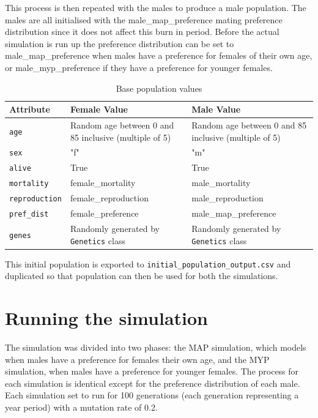 \documentclass[authoryearcitations]{UoYCSproject}
\begin{document}
This process is then repeated with the males to produce a male population. The males are all initialised with the male\_map\_preference mating preference distribution since it does not affect this burn in period. Before the actual simulation is run up the preference distribution can be set to male\_map\_preference when males have a preference for females of their own age, or male\_myp\_preference if they have a preference for younger females. 


\begin{table}[h]
\caption{Base population values}
\label{tbl:basePopulationValues}
\begin{tabular}{m{} m{} m{}}
\textbf{Attribute} & \textbf{Female Value} & \textbf{Male Value} \\\hline
\texttt{age} & Random age between 0 and 85 inclusive (multiple of 5) & Random age between 0 and 85 inclusive (multiple of 5) \\\hline
\texttt{sex} & "f" & "m" \\\hline
\texttt{alive} & True & True \\\hline
\texttt{mortality} & female\_mortality & male\_mortality \\\hline
\texttt{reproduction} & female\_reproduction & male\_reproduction \\\hline
\texttt{pref\_dist} & female\_preference & male\_map\_preference \\\hline 
\texttt{genes} & Randomly generated by \texttt{Genetics} class & Randomly generated by \texttt{Genetics} class
\end{tabular}
\end{table}

This initial population is exported to \texttt{initial\_population\_output.csv} and duplicated so that population can then be used for both the simulations.

\section{Running the simulation}
The simulation was divided into two phases: the MAP simulation, which models when males have a preference for females their own age, and the MYP simulation, when males have a preference for younger females. The process for each simulation is identical except for the preference distribution of each male. Each simulation set to run for 100 generations (each generation representing a year period) with a mutation rate of 0.2.
\end{document}
